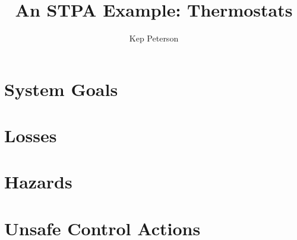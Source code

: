\documentclass[a4paper]{tufte-handout}
\title{An STPA Example: Thermostats}
\author{Kep Peterson}
\begin{document}
\maketitle

\setlength{\parindent}{0em}
\setlength{\parskip}{1em}

\section{System Goals}



\section{Losses}


\section{Hazards}


%
 
\section{Unsafe Control Actions}


%


%

%
 
\end{document}
